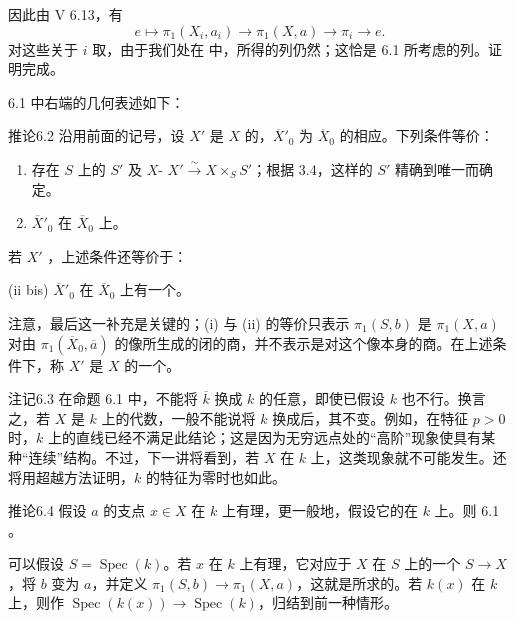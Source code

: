 因此由 V 6.13，有
\[
e\longmapsto\pi_1(X_i,a_i)\longrightarrow\pi_1(X,a)\longrightarrow\pi_i\longrightarrow e.
\]
对这些关于 $i$ 取，由于我们处在 中，所得的列仍然；这恰是 6.1 所考虑的列。证明完成。

6.1 中右端的几何表述如下：
\begin{SGAresult}{推论}{6.2}
沿用前面的记号，设 $X'$ 是 $X$ 的，$\overline X'_0$ 为 $\overline X_0$ 的相应。下列条件等价：
\begin{enumerate}[label=(\roman*)]
\item 存在 $S$ 上的 $S'$ 及 $X$- $X'\xrightarrow{\sim}X\times_S S'$；根据 3.4，这样的 $S'$ 精确到唯一而确定。
\item $\overline X'_0$ 在 $\overline X_0$ 上。
\end{enumerate}
若 $X'$ ，上述条件还等价于：
\par\noindent (ii bis) $\overline X'_0$ 在 $\overline X_0$ 上有一个。
\end{SGAresult}
注意，最后这一补充是关键的；(i) 与 (ii) 的等价只表示 $\pi_1(S,b)$ 是 $\pi_1(X,a)$ 对由 $\pi_1(\overline X_0,\overline a)$ 的像所生成的闭的商，并不表示是对这个像本身的商。在上述条件下，称 $X'$ 是 $X$ 的一个。
\begin{SGAresult}{注记}{6.3}
在命题 6.1 中，不能将 $\overline k$ 换成 $k$ 的任意，即使已假设 $k$ 也不行。换言之，若 $X$ 是 $k$ 上的代数，一般不能说将 $k$ 换成后，其不变。例如，在特征 $p>0$ 时，$k$ 上的直线已经不满足此结论；这是因为无穷远点处的“高阶”现象使具有某种“连续”结构。不过，下一讲将看到，若 $X$ 在 $k$ 上，这类现象就不可能发生。还将用超越方法证明，$k$ 的特征为零时也如此。
\end{SGAresult}
\begin{SGAresult}{推论}{6.4}
假设 $a$ 的支点 $x\in X$ 在 $k$ 上有理，更一般地，假设它的在 $k$ 上。则 6.1 。
\end{SGAresult}
可以假设 $S=\operatorname{Spec}(k)$。若 $x$ 在 $k$ 上有理，它对应于 $X$ 在 $S$ 上的一个 $S\to X$，将 $b$ 变为 $a$，并定义 $\pi_1(S,b)\to\pi_1(X,a)$，这就是所求的。若 $k(x)$ 在 $k$ 上，则作 $\operatorname{Spec}(k(x))\to\operatorname{Spec}(k)$，归结到前一种情形。

